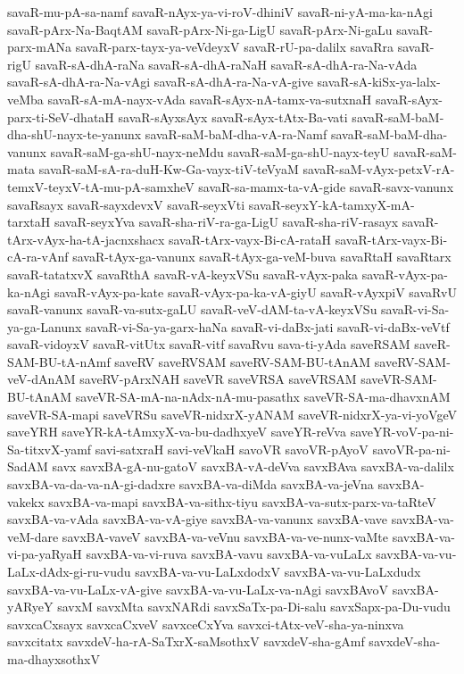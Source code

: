{savaR-mu-pA-sa-namf
savaR-nAyx-ya-vi-roV-dhiniV
savaR-ni-yA-ma-ka-nAgi
savaR-pArx-Na-BaqtAM
savaR-pArx-Ni-ga-LigU
savaR-pArx-Ni-gaLu
savaR-parx-mANa
savaR-parx-tayx-ya-veVdeyxV
savaR-rU-pa-dalilx
savaRra
savaR-rigU
savaR-sA-dhA-raNa
savaR-sA-dhA-raNaH
savaR-sA-dhA-ra-Na-vAda
savaR-sA-dhA-ra-Na-vAgi
savaR-sA-dhA-ra-Na-vA-give
savaR-sA-kiSx-ya-lalx-veMba
savaR-sA-mA-nayx-vAda
savaR-sAyx-nA-tamx-va-sutxnaH
savaR-sAyx-parx-ti-SeV-dhataH
savaR-sAyxsAyx
savaR-sAyx-tAtx-Ba-vati
savaR-saM-baM-dha-shU-nayx-te-yanunx
savaR-saM-baM-dha-vA-ra-Namf
savaR-saM-baM-dha-vanunx
savaR-saM-ga-shU-nayx-neMdu
savaR-saM-ga-shU-nayx-teyU
savaR-saM-mata
savaR-saM-sA-ra-duH-Kw-Ga-vayx-tiV-teVyaM
savaR-saM-vAyx-petxV-rA-temxV-teyxV-tA-mu-pA-samxheV
savaR-sa-mamx-ta-vA-gide
savaR-savx-vanunx
savaRsayx
savaR-sayxdevxV
savaR-seyxVti
savaR-seyxY-kA-tamxyX-mA-tarxtaH
savaR-seyxYva
savaR-sha-riV-ra-ga-LigU
savaR-sha-riV-rasayx
savaR-tArx-vAyx-ha-tA-jacnxshacx
savaR-tArx-vayx-Bi-cA-rataH
savaR-tArx-vayx-Bi-cA-ra-vAnf
savaR-tAyx-ga-vanunx
savaR-tAyx-ga-veM-buva
savaRtaH
savaRtarx
savaR-tatatxvX
savaRthA
savaR-vA-keyxVSu
savaR-vAyx-paka
savaR-vAyx-pa-ka-nAgi
savaR-vAyx-pa-kate
savaR-vAyx-pa-ka-vA-giyU
savaR-vAyxpiV
savaRvU
savaR-vanunx
savaR-va-sutx-gaLU
savaR-veV-dAM-ta-vA-keyxVSu
savaR-vi-Sa-ya-ga-Lanunx
savaR-vi-Sa-ya-garx-haNa
savaR-vi-daBx-jati
savaR-vi-daBx-veVtf
savaR-vidoyxV
savaR-vitUtx
savaR-vitf
savaRvu
sava-ti-yAda
saveRSAM
saveR-SAM-BU-tA-nAmf
saveRV
saveRVSAM
saveRV-SAM-BU-tAnAM
saveRV-SAM-veV-dAnAM
saveRV-pArxNAH
saveVR
saveVRSA
saveVRSAM
saveVR-SAM-BU-tAnAM
saveVR-SA-mA-na-nAdx-nA-mu-pasathx
saveVR-SA-ma-dhavxnAM
saveVR-SA-mapi
saveVRSu
saveVR-nidxrX-yANAM
saveVR-nidxrX-ya-vi-yoVgeV
saveYRH
saveYR-kA-tAmxyX-va-bu-dadhxyeV
saveYR-reVva
saveYR-voV-pa-ni-Sa-titxvX-yamf
savi-satxraH
savi-veVkaH
savoVR
savoVR-pAyoV
savoVR-pa-ni-SadAM
savx
savxBA-gA-nu-gatoV
savxBA-vA-deVva
savxBAva
savxBA-va-dalilx
savxBA-va-da-va-nA-gi-dadxre
savxBA-va-diMda
savxBA-va-jeVna
savxBA-vakekx
savxBA-va-mapi
savxBA-va-sithx-tiyu
savxBA-va-sutx-parx-va-taRteV
savxBA-va-vAda
savxBA-va-vA-giye
savxBA-va-vanunx
savxBA-vave
savxBA-va-veM-dare
savxBA-vaveV
savxBA-va-veVnu
savxBA-va-ve-nunx-vaMte
savxBA-va-vi-pa-yaRyaH
savxBA-va-vi-ruva
savxBA-vavu
savxBA-va-vuLaLx
savxBA-va-vu-LaLx-dAdx-gi-ru-vudu
savxBA-va-vu-LaLxdodxV
savxBA-va-vu-LaLxdudx
savxBA-va-vu-LaLx-vA-give
savxBA-va-vu-LaLx-va-nAgi
savxBAvoV
savxBA-yARyeY
savxM
savxMta
savxNARdi
savxSaTx-pa-Di-salu
savxSapx-pa-Du-vudu
savxcaCxsayx
savxcaCxveV
savxceCxYva
savxci-tAtx-veV-sha-ya-ninxva
savxcitatx
savxdeV-ha-rA-SaTxrX-saMsothxV
savxdeV-sha-gAmf
savxdeV-sha-ma-dhayxsothxV
}

